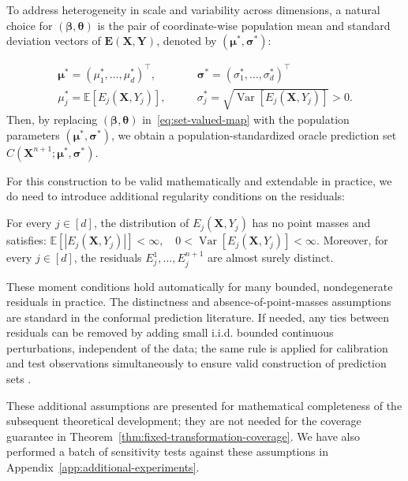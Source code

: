 To address heterogeneity in scale and variability across dimensions, a natural choice for $(\boldsymbol\beta,\boldsymbol\theta)$ is the pair of coordinate-wise population mean and standard deviation vectors of $\mathbf E(\mathbf X,\mathbf Y)$, denoted by $(\boldsymbol\mu^*,\boldsymbol\sigma^*)$:

\begin{equation}\label{eq:oracle-mean-std}
\begin{aligned}
\boldsymbol\mu^* = (\mu^*_1,\ldots,\mu^*_d)^\top,
\qquad
&\boldsymbol\sigma^* = (\sigma^*_1,\ldots,\sigma^*_d)^\top\\
\mu_j^*=\mathbb E[E_j(\mathbf X,Y_j)],
\qquad
&\sigma_j^*=\sqrt{\operatorname{Var}[E_j(\mathbf X,Y_j)]}>0.
\end{aligned}
\end{equation}
Then, by replacing $(\boldsymbol\beta,\boldsymbol\theta)$ in~\eqref{eq:set-valued-map} with the population parameters $(\boldsymbol\mu^*,\boldsymbol\sigma^*)$, we obtain a population-standardized oracle prediction set $C(\mathbf X^{n+1};\boldsymbol\mu^*,\boldsymbol\sigma^*)$.

For this construction to be valid mathematically and extendable in practice, we do need to introduce additional regularity conditions on the residuals:

\begin{assumption}\label{eq:assumption-scores}
For every $j\in[d]$, the distribution of $E_j(\mathbf X,Y_j)$ has no point masses and satisfies: $\mathbb E\left[|E_j(\mathbf X,Y_j)|\right]<\infty,
\quad
0<\operatorname{Var}\left[E_j(\mathbf X,Y_j)\right]<\infty.$
Moreover, for every $j\in[d]$, the residuals $E_j^1,\ldots,E_j^{n+1}$ are almost surely distinct.
\end{assumption}

These moment conditions hold automatically for many bounded, nondegenerate residuals in practice. The distinctness and absence-of-point-masses assumptions are standard in the conformal prediction literature. If needed, any ties between residuals can be removed by adding small i.i.d. bounded continuous perturbations, independent of the data; the same rule is applied for calibration and test observations simultaneously to ensure valid construction of prediction sets \citep{vovk2005algorithmic}.

These additional assumptions are presented for mathematical completeness of the subsequent theoretical development; they are not needed for the coverage guarantee in Theorem~\ref{thm:fixed-transformation-coverage}. We have also performed a batch of sensitivity tests against these assumptions in Appendix~\ref{app:additional-experiments}.

